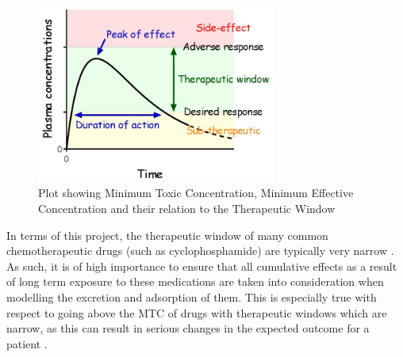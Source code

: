 \begin{figure}[h]
	\centering
	\includegraphics[width=0.7\textwidth]{Images/therapeutic-window.jpg}
	\caption{Plot showing Minimum Toxic Concentration, Minimum Effective Concentration and their relation to the Therapeutic Window \cite{Therapeutic_Index_And_Window}}
    \label{fig:theraputic_window}
\end{figure}

	
In terms of this project, the therapeutic window of many common chemotherapeutic drugs (such as cyclophosphamide) are typically very narrow \cite{cyclophosphamide_details}. As such, it is of high importance to ensure that all cumulative effects as a result of long term exposure to these medications are taken into consideration when modelling the excretion and adsorption of them. This is especially true with respect to going above the MTC of drugs with therapeutic windows which are narrow, as this can result in serious changes in the expected outcome for a patient \cite{Clinical_Pharmacokinetics_and_Pharmacodynamics_Concepts}.


